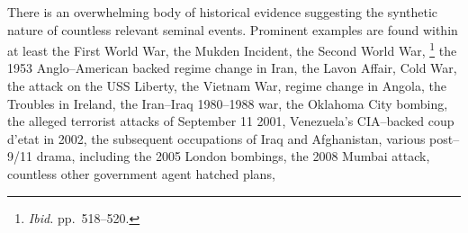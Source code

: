 There is an overwhelming body of historical evidence suggesting the synthetic nature of countless relevant seminal events. Prominent examples are found within at least the First World War,
the Mukden Incident,
the Second World War,
\footnotecite[extras={ p.~193.}][shirer1960]\footnote{{\it Ibid.} pp.~518--520.} %
the 1953 Anglo--American backed regime change in Iran,
\footnotecite[gasiorowski2000] %
the Lavon Affair,
Cold War,
\footnotecite[northwoods]
the attack on the USS Liberty,
the Vietnam War,
\footnotecite[bumiller2010] %
regime change in Angola,
the Troubles in Ireland,
the Iran--Iraq 1980--1988 war,
the Oklahoma City bombing,
the alleged terrorist attacks of September 11 2001, %
\footnotecite[gourley2012] 
\footnotecite[harrit2009]
Venezuela's CIA--backed coup d'etat in 2002, %
the subsequent occupations of Iraq %
and Afghanistan, %
\footnotecite[extras={ p.~74.}][grad2009]
various post--9/11 drama, %
\footnotecite[king2010]
including the 2005 London bombings, %
\footnotecite[secker2010] 
the 2008 Mumbai attack, %
countless other government agent hatched plans, %
